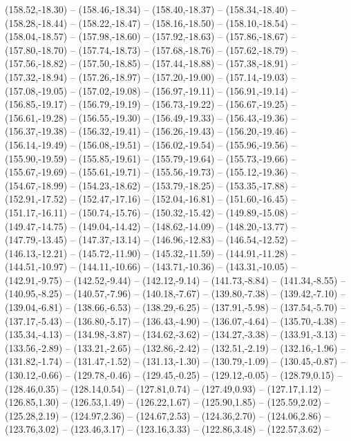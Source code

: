 {  (158.52,-18.30) -- (158.46,-18.34) -- (158.40,-18.37) -- (158.34,-18.40) -- (158.28,-18.44) -- (158.22,-18.47) -- (158.16,-18.50) --
  (158.10,-18.54) -- (158.04,-18.57) -- (157.98,-18.60) -- (157.92,-18.63) -- (157.86,-18.67) -- (157.80,-18.70) -- (157.74,-18.73) --
  (157.68,-18.76) -- (157.62,-18.79) -- (157.56,-18.82) -- (157.50,-18.85) -- (157.44,-18.88) -- (157.38,-18.91) -- (157.32,-18.94) --
  (157.26,-18.97) -- (157.20,-19.00) -- (157.14,-19.03) -- (157.08,-19.05) -- (157.02,-19.08) -- (156.97,-19.11) -- (156.91,-19.14) --
  (156.85,-19.17) -- (156.79,-19.19) -- (156.73,-19.22) -- (156.67,-19.25) -- (156.61,-19.28) -- (156.55,-19.30) -- (156.49,-19.33) --
  (156.43,-19.36) -- (156.37,-19.38) -- (156.32,-19.41) -- (156.26,-19.43) -- (156.20,-19.46) -- (156.14,-19.49) -- (156.08,-19.51) --
  (156.02,-19.54) -- (155.96,-19.56) -- (155.90,-19.59) -- (155.85,-19.61) -- (155.79,-19.64) -- (155.73,-19.66) -- (155.67,-19.69) --
  (155.61,-19.71) -- (155.56,-19.73) -- (155.12,-19.36) -- (154.67,-18.99) -- (154.23,-18.62) -- (153.79,-18.25) -- (153.35,-17.88) --
  (152.91,-17.52) -- (152.47,-17.16) -- (152.04,-16.81) -- (151.60,-16.45) -- (151.17,-16.11) -- (150.74,-15.76) -- (150.32,-15.42) --
  (149.89,-15.08) -- (149.47,-14.75) -- (149.04,-14.42) -- (148.62,-14.09) -- (148.20,-13.77) -- (147.79,-13.45) -- (147.37,-13.14) --
  (146.96,-12.83) -- (146.54,-12.52) -- (146.13,-12.21) -- (145.72,-11.90) -- (145.32,-11.59) -- (144.91,-11.28) -- (144.51,-10.97) --
  (144.11,-10.66) -- (143.71,-10.36) -- (143.31,-10.05) -- (142.91,-9.75) -- (142.52,-9.44) -- (142.12,-9.14) -- (141.73,-8.84) --
  (141.34,-8.55) -- (140.95,-8.25) -- (140.57,-7.96) -- (140.18,-7.67) -- (139.80,-7.38) -- (139.42,-7.10) -- (139.04,-6.81) --
  (138.66,-6.53) -- (138.29,-6.25) -- (137.91,-5.98) -- (137.54,-5.70) -- (137.17,-5.43) -- (136.80,-5.17) -- (136.43,-4.90) --
  (136.07,-4.64) -- (135.70,-4.38) -- (135.34,-4.13) -- (134.98,-3.87) -- (134.62,-3.62) -- (134.27,-3.38) -- (133.91,-3.13) --
  (133.56,-2.89) -- (133.21,-2.65) -- (132.86,-2.42) -- (132.51,-2.19) -- (132.16,-1.96) -- (131.82,-1.74) -- (131.47,-1.52) --
  (131.13,-1.30) -- (130.79,-1.09) -- (130.45,-0.87) -- (130.12,-0.66) -- (129.78,-0.46) -- (129.45,-0.25) -- (129.12,-0.05) --
  (128.79,0.15) -- (128.46,0.35) -- (128.14,0.54) -- (127.81,0.74) -- (127.49,0.93) -- (127.17,1.12) -- (126.85,1.30) --
  (126.53,1.49) -- (126.22,1.67) -- (125.90,1.85) -- (125.59,2.02) -- (125.28,2.19) -- (124.97,2.36) -- (124.67,2.53) --
  (124.36,2.70) -- (124.06,2.86) -- (123.76,3.02) -- (123.46,3.17) -- (123.16,3.33) -- (122.86,3.48) -- (122.57,3.62) --
}
